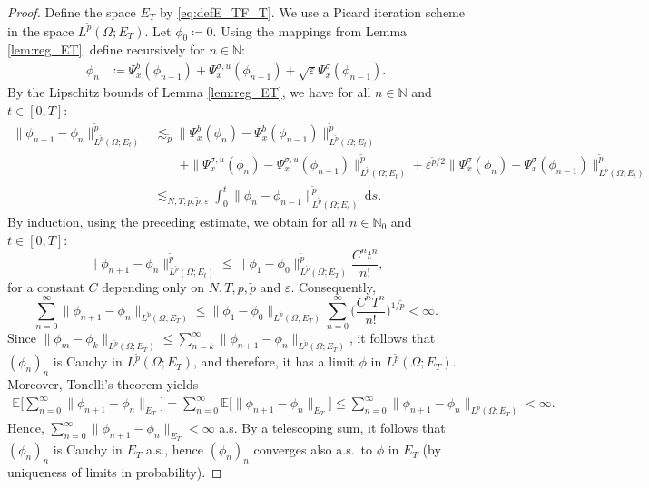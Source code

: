 \documentclass{amsart}
\theoremstyle{plain}
\theoremstyle{remark}
\theoremstyle{plain}
\numberwithin{equation}{section}
\newcommand{\N}{\mathbb{N}}
\newcommand{\ceqq}{\coloneqq}
\newcommand{\E}{{\mathbb E}}
\newcommand{\eps}{\varepsilon}
\newcommand{\Om}{\Omega}
\newcommand{\dd}{\,\mathrm{d}}
\begin{document}
\begin{proof} Define the space $E_T$ by \eqref{eq:defE_TF_T}. We use a Picard iteration scheme in the space $L^{\tilde p}(\Om;E_T)$. 
Let $\phi_0\ceqq 0$. Using the mappings from Lemma \ref{lem:reg_ET}, define recursively for $n\in\N$:
\begin{align}\label{eq:phi_n recursion}
\phi_n &\ceqq  \Psi_x^b(\phi_{n-1})+\Psi_x^{\sigma,u}(\phi_{n-1})+\sqrt{\eps} \Psi_x^\sigma(\phi_{n-1}). 
\end{align}  
By the Lipschitz bounds of Lemma \ref{lem:reg_ET}, we have for all $n\in\N$ and $t\in[0,T]$:
\begin{align*}
\|\phi_{n+1}-\phi_n\|_{L^{\tilde p}(\Om;E_t)}^{\tilde p} 
&\lesssim_{\tilde p} 
\|\Psi_x^b(\phi_{n})-\Psi_x^b(\phi_{n-1})\|_{L^{\tilde p}(\Om;E_t)}^{\tilde p}\\
&\qquad+\|\Psi_x^{\sigma,u}(\phi_{n})-\Psi_x^{\sigma,u}(\phi_{n-1})\|_{L^{\tilde p}(\Om;E_t)}^{\tilde p}+
\eps^{\tilde p/2}\|\Psi_x^\sigma(\phi_{n})-\Psi_x^\sigma(\phi_{n-1})\|_{L^{\tilde p}(\Om;E_t)}^{\tilde p} \\
&\lesssim_{N,T,p,\tilde p,\eps} \int_0^t \| \phi_n - \phi_{n-1}\|_{L^{\tilde p}(\Om;E_s)}^{\tilde p}\dd s. 
\end{align*}
By induction, using the preceding estimate, we obtain for all $n\in\N_0$ and $t\in[0,T]$:  
\[\|\phi_{n+1} - \phi_n\|_{L^{\tilde{p}}(\Om;E_t)}^{\tilde p} \leq \|\phi_1 - \phi_0\|_{L^{\tilde{p}}(\Om;E_T)}^{\tilde p} \frac{C^n t^n}{n!}, \]
for a constant $C$ depending only on $N,T,p,\tilde p$ and $\eps$. Consequently,
\[
\sum_{n=0}^{\infty}
\|\phi_{n+1}-\phi_n\|_{L^{\tilde p}(\Om;E_T)}
\leq
\|\phi_1-\phi_0\|_{L^{\tilde p}(\Om;E_T)}
\sum_{n=0}^{\infty}
\Big(\frac{C^nT^n}{n!}\Big)^{1/\tilde p}
<\infty.
\]
Since $\|\phi_{m}-\phi_k\|_{L^{\tilde p}(\Om;E_T)}\leq \sum_{n=k}^\infty \|\phi_{n+1}-\phi_n\|_{L^{\tilde p}(\Om;E_T)}$, it follows that   $(\phi_n)_n$ is
Cauchy in $L^{\tilde p}(\Om;E_T)$, and therefore, it has a limit $\phi$ in $L^{\tilde p}(\Om;E_T)$. 
Moreover, 
Tonelli's theorem yields
\begin{align*}
\E\Big[
\sum_{n=0}^{\infty}
\|\phi_{n+1}-\phi_n\|_{E_T}
\Big]=
\sum_{n=0}^{\infty}
\E\Big[
\|\phi_{n+1}-\phi_n\|_{E_T}
\Big] \leq
\sum_{n=0}^{\infty}
\|\phi_{n+1}-\phi_n\|_{L^{\tilde p}(\Om;E_T)}
<\infty.
\end{align*}
Hence, $\sum_{n=0}^{\infty}
\|\phi_{n+1}-\phi_n\|_{E_T}<\infty$ a.s.  
By a telescoping sum, it follows that 
$(\phi_n)_n$ is
Cauchy in $E_T$ a.s., hence $(\phi_n)_n$ converges also a.s.\ to $\phi$ in $E_T$ (by uniqueness of limits in probability). 



\end{proof}
\end{document}
